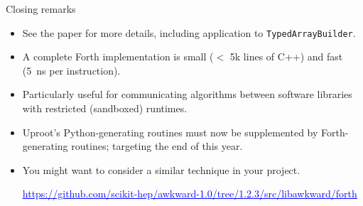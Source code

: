 \documentclass[aspectratio=169]{beamer}
\begin{document}
\begin{frame}{Closing remarks}
\Large
\vspace{0.25 cm}
\begin{itemize}[<+-|alert@+>]\setlength{\itemsep}{0.2 cm}
\item See the paper for more details, including application to \texttt{TypedArrayBuilder}.
\item A complete Forth implementation is small ($<$ 5k lines of C++) and fast (5~ns per instruction).
\item Particularly useful for communicating algorithms between software libraries with restricted (sandboxed) runtimes.
\item Uproot's Python-generating routines must now be supplemented by Forth-generating routines; targeting the end of this year.
\item You might want to consider a similar technique in your project. \scriptsize

\vspace{0.1 cm}
\hfill\href{https://github.com/scikit-hep/awkward-1.0/tree/1.2.3/src/libawkward/forth}{\textcolor{blue}{\underline{https://github.com/scikit-hep/awkward-1.0/tree/1.2.3/src/libawkward/forth}}}

\end{itemize}
\end{frame}
\end{document}
